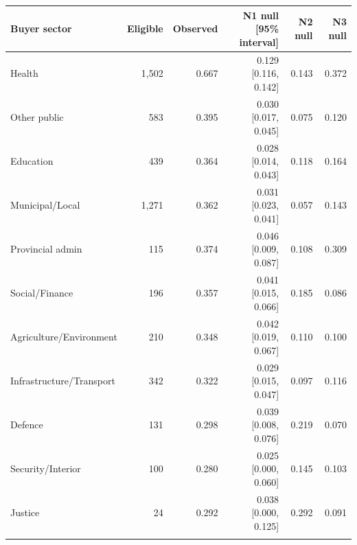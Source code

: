 \begin{tabular}{@{}lrrrrr@{}}
\toprule
Buyer sector & Eligible & Observed & N1 null [95\% interval] & N2 null & N3 null\\
\midrule
Health & 1,502 & 0.667 & 0.129 [0.116, 0.142] & 0.143 & 0.372\\
Other public & 583 & 0.395 & 0.030 [0.017, 0.045] & 0.075 & 0.120\\
Education & 439 & 0.364 & 0.028 [0.014, 0.043] & 0.118 & 0.164\\
Municipal/Local & 1,271 & 0.362 & 0.031 [0.023, 0.041] & 0.057 & 0.143\\
Provincial admin & 115 & 0.374 & 0.046 [0.009, 0.087] & 0.108 & 0.309\\
Social/Finance & 196 & 0.357 & 0.041 [0.015, 0.066] & 0.185 & 0.086\\
Agriculture/Environment & 210 & 0.348 & 0.042 [0.019, 0.067] & 0.110 & 0.100\\
Infrastructure/Transport & 342 & 0.322 & 0.029 [0.015, 0.047] & 0.097 & 0.116\\
Defence & 131 & 0.298 & 0.039 [0.008, 0.076] & 0.219 & 0.070\\
Security/Interior & 100 & 0.280 & 0.025 [0.000, 0.060] & 0.145 & 0.103\\
Justice & 24 & 0.292 & 0.038 [0.000, 0.125] & 0.292 & 0.091\\
\botrule
\end{tabular}